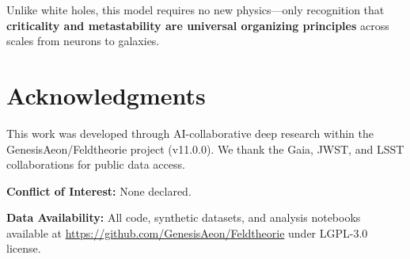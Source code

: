 \documentclass[11pt,a4paper,twocolumn]{article}
\begin{document}
Unlike white holes, this model requires no new physics---only recognition that \textbf{criticality and metastability are universal organizing principles} across scales from neurons to galaxies.

\section*{Acknowledgments}

This work was developed through AI-collaborative deep research within the GenesisAeon/Feldtheorie project (v11.0.0). We thank the Gaia, JWST, and LSST collaborations for public data access.

\textbf{Conflict of Interest:} None declared.

\textbf{Data Availability:} All code, synthetic datasets, and analysis notebooks available at \url{https://github.com/GenesisAeon/Feldtheorie} under LGPL-3.0 license.
\end{document}
